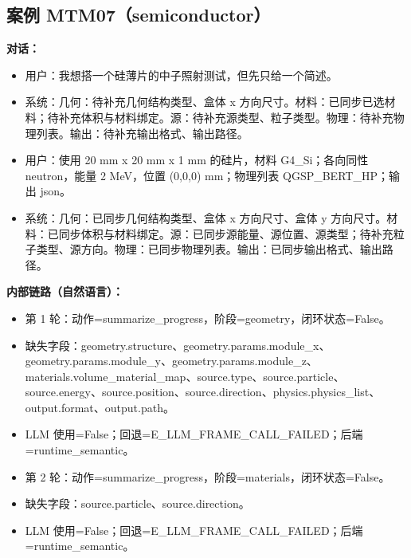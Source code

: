 \documentclass[11pt]{ctexart}
\begin{document}
\subsection{案例 MTM07（semiconductor）}
\textbf{对话：}
\begin{itemize}
\item 用户：我想搭一个硅薄片的中子照射测试，但先只给一个简述。
\item 系统：几何：待补充几何结构类型、盒体 x 方向尺寸。材料：已同步已选材料；待补充体积与材料绑定。源：待补充源类型、粒子类型。物理：待补充物理列表。输出：待补充输出格式、输出路径。
\item 用户：使用 20 mm x 20 mm x 1 mm 的硅片，材料 G4\_Si；各向同性 neutron，能量 2 MeV，位置 (0,0,0) mm；物理列表 QGSP\_BERT\_HP；输出 json。
\item 系统：几何：已同步几何结构类型、盒体 x 方向尺寸、盒体 y 方向尺寸。材料：已同步体积与材料绑定。源：已同步源能量、源位置、源类型；待补充粒子类型、源方向。物理：已同步物理列表。输出：已同步输出格式、输出路径。
\end{itemize}
\textbf{内部链路（自然语言）：}
\begin{itemize}
\item 第 1 轮：动作=summarize\_progress，阶段=geometry，闭环状态=False。
\item 缺失字段：geometry.structure、geometry.params.module\_x、geometry.params.module\_y、geometry.params.module\_z、materials.volume\_material\_map、source.type、source.particle、source.energy、source.position、source.direction、physics.physics\_list、output.format、output.path。
\item LLM 使用=False；回退=E\_LLM\_FRAME\_CALL\_FAILED；后端=runtime\_semantic。
\item 第 2 轮：动作=summarize\_progress，阶段=materials，闭环状态=False。
\item 缺失字段：source.particle、source.direction。
\item LLM 使用=False；回退=E\_LLM\_FRAME\_CALL\_FAILED；后端=runtime\_semantic。
\end{itemize}
\end{document}
